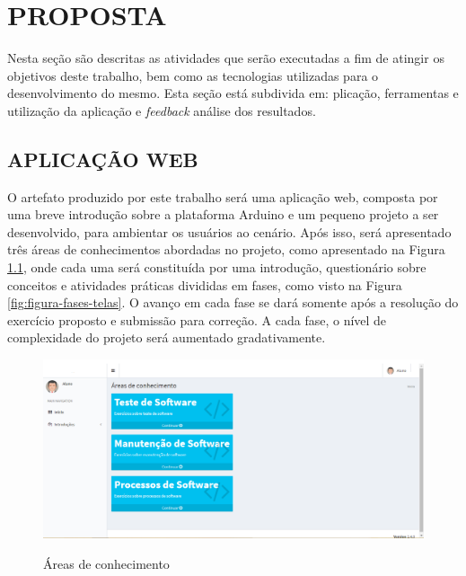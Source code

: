 \chapter{PROPOSTA}
\label{chap:proposta}

Nesta seção são descritas as atividades que serão executadas a fim de atingir os objetivos deste trabalho, bem como as tecnologias utilizadas para o desenvolvimento do mesmo. Esta seção está subdivida em: plicação, ferramentas e utilização da aplicação e \textit{feedback} análise dos resultados.  

\section{APLICAÇÃO WEB}
\label{sec:desenvApp}



O artefato produzido por este trabalho será uma aplicação web, composta por uma breve introdução sobre a plataforma Arduino e um pequeno projeto a ser desenvolvido, para ambientar os usuários ao cenário. Após isso, será apresentado três áreas de conhecimentos abordadas no projeto, como apresentado na Figura \ref{fig:figura-areas-telas}, onde cada uma será constituída por uma introdução, questionário sobre conceitos e atividades práticas divididas em fases, como visto na Figura \ref{fig:figura-fases-telas}. O avanço em cada fase se dará somente após a resolução do exercício proposto e submissão para correção. A cada fase, o nível de complexidade do projeto será aumentado gradativamente.

\begin{figure}[!htb]
    \centering
    \caption{Áreas de conhecimento}
    \includegraphics[width=1\textwidth]{./dados/figuras/areasTela}
    \label{fig:figura-areas-telas}
\end{figure}

